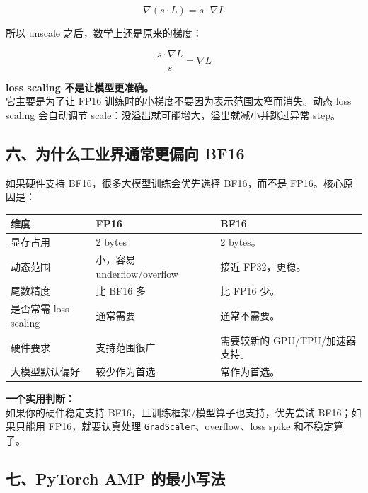 \[
\nabla(s \cdot L) = s \cdot \nabla L
\]

所以 unscale 之后，数学上还是原来的梯度：

\[
\frac{s \cdot \nabla L}{s} = \nabla L
\]

\begin{warnbox}
\textbf{loss scaling 不是让模型更准确。}\\
它主要是为了让 FP16 训练时的小梯度不要因为表示范围太窄而消失。动态 loss scaling 会自动调节 scale：没溢出就可能增大，溢出就减小并跳过异常 step。
\end{warnbox}

\subsection{六、为什么工业界通常更偏向 BF16}

如果硬件支持 BF16，很多大模型训练会优先选择 BF16，而不是 FP16。核心原因是：

\begin{center}
{\small
\begin{tabular}{p{3.2cm}p{4.1cm}p{5cm}}
\hline
\textbf{维度} & \textbf{FP16} & \textbf{BF16} \\
\hline
显存占用 & 2 bytes & 2 bytes。 \\
动态范围 & 小，容易 underflow/overflow & 接近 FP32，更稳。 \\
尾数精度 & 比 BF16 多 & 比 FP16 少。 \\
是否常需 loss scaling & 通常需要 & 通常不需要。 \\
硬件要求 & 支持范围很广 & 需要较新的 GPU/TPU/加速器支持。 \\
大模型默认偏好 & 较少作为首选 & 常作为首选。 \\
\hline
\end{tabular}
}
\end{center}

\begin{intubox}
\textbf{一个实用判断：}\\
如果你的硬件稳定支持 BF16，且训练框架/模型算子也支持，优先尝试 BF16；如果只能用 FP16，就要认真处理 \texttt{GradScaler}、overflow、loss spike 和不稳定算子。
\end{intubox}

\subsection{七、PyTorch AMP 的最小写法}

